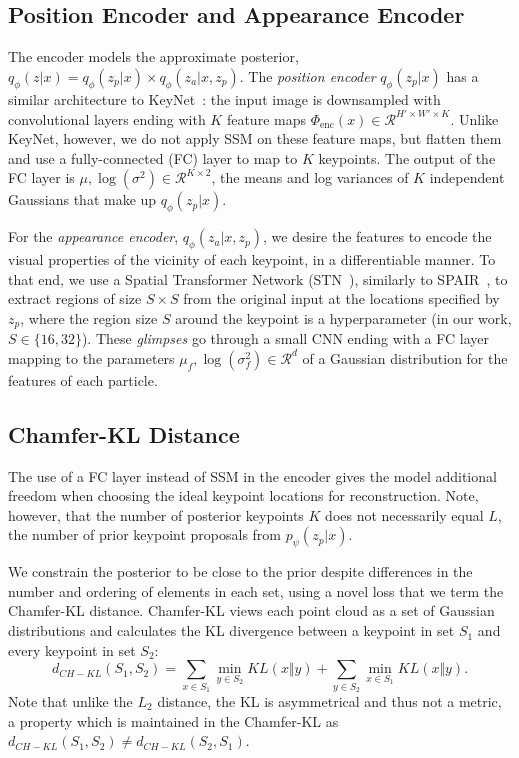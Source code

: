 \documentclass[nohyperref]{article}
\theoremstyle{plain}
\theoremstyle{definition}
\theoremstyle{remark}
\newcommand{\encftrs}{\Phi_{\textrm{enc}}}
\begin{document}
\subsection{Position Encoder and Appearance Encoder}
The encoder models the approximate posterior, $q_{\phi}(z|x)=q_{\phi}(z_p|x)\times q_{\phi}(z_a|x, z_p)$. The \textit{position encoder} $q_{\phi}(z_p|x)$ has a similar architecture to KeyNet~\citep{jakab2018unsupervised}: the input image is downsampled with convolutional layers ending with $K$ feature maps $\encftrs(x) \in \mathcal{R}^{H' \times W' \times K}$. 
Unlike KeyNet, however, we do not apply SSM on these feature maps, but flatten them and use a fully-connected (FC) layer to map to $K$ keypoints. The output of the FC layer is $\mu, \log(\sigma^2) \in \mathcal{R}^{K \times 2}$, the means and log variances of $K$ independent Gaussians that make up $q_{\phi}(z_p|x)$.



For the \textit{appearance encoder}, $q_{\phi}(z_a|x, z_p)$, we desire the features to encode the visual properties of the vicinity of each keypoint, in a differentiable manner.
To that end, we use a Spatial Transformer Network (STN~\citealt{jaderberg2015stn}), similarly to SPAIR~\citep{crawford2019spair}, to extract regions of size $S\times S$ from the original input at the locations specified by $z_p$, where the region size $S$ around the keypoint is a hyperparameter (in our work, $S \in \{16, 32\}$). These \textit{glimpses} go through 
a small CNN ending with a FC layer mapping to the parameters $\mu_f, \log(\sigma_f^2)\in \mathcal{R}^{d}$ of a Gaussian distribution for the features of each particle.


\subsection{Chamfer-KL Distance}\label{subsec:chamfer_kl} 
The use of a FC layer instead of SSM in the encoder gives the model additional freedom when choosing the ideal keypoint locations for reconstruction. 
Note, however, that the number of posterior keypoints $K$ does not necessarily equal $L$, the number of prior keypoint proposals from $p_{\psi}(z_p|x)$. 

We constrain the posterior to be close to the prior despite differences in the number and ordering of elements in each set, using a novel loss that we term the Chamfer-KL distance. 
Chamfer-KL views each point cloud as a set of Gaussian distributions and calculates the KL divergence between a keypoint in set $S_1$ and every keypoint in set $S_2$: $$ d_{CH-KL}(S_1, \!S_2)\! = \!\!\!\sum_{x \in S_1}\!\min_{y \in S_2}KL(x \Vert y) +\!\! \sum_{y \in S_2}\!\min_{x \in S_1}KL(x \Vert y). $$ Note that unlike the $L_2$ distance, the KL is asymmetrical and thus not a metric, a property which is maintained in the Chamfer-KL as $d_{CH-KL}(S_1, S_2) \neq d_{CH-KL}(S_2, S_1)$. 
\end{document}
